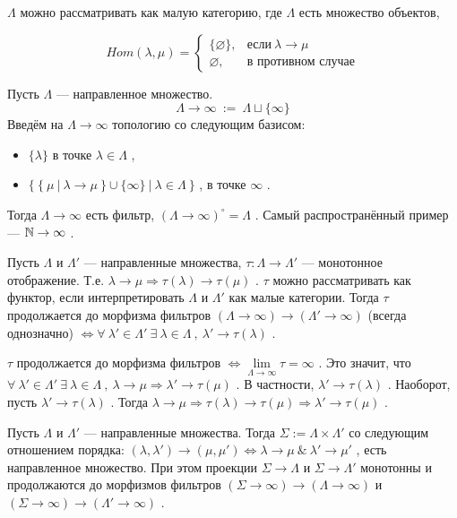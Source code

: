 \( \Lambda \) можно рассматривать как малую категорию, где \( \Lambda \) есть множество объектов,

\[ Hom(\lambda,\mu)=
   \begin{cases}
   \{\varnothing\}, & \text{если} ~\lambda \rightarrow \mu \\
   \varnothing    , & \text{в противном случае}
   \end{cases}
\]

\SSsect[def] Пусть \( \Lambda \) --- направленное множество.
\[ \Lambda \rightarrow \infty ~:=~ \Lambda \sqcup \{\infty\} \]
Введём на \( \Lambda \rightarrow \infty \) топологию со следующим базисом:
\begin{itemize}[label=]
\item \( \{\lambda\} \) в точке \( \lambda \in \Lambda \) ,
\item \( \{~\{~\mu~|~\lambda\rightarrow\mu~\} \cup \{\infty\} ~|~ \lambda \in \Lambda ~\} \) , в точке \( \infty \) .
\end{itemize}
Тогда \( \Lambda \rightarrow \infty \) есть фильтр, \( (\Lambda \rightarrow \infty)^\circ=\Lambda \) . Самый распространённый пример --- \( \mathbb{N} \rightarrow \infty \) .

\SSsect Пусть \( \Lambda \) и \( \Lambda' \) --- направленные множества, \( \tau: \Lambda \rightarrow \Lambda' \) --- монотонное отображение. Т.е. \( \lambda \rightarrow \mu \Rightarrow \tau(\lambda) \rightarrow \tau(\mu) \) . \( \tau \) можно рассматривать как функтор, если интерпретировать \( \Lambda \) и \( \Lambda' \) как малые категории.
Тогда \( \tau \) продолжается до морфизма фильтров \( (\Lambda \rightarrow \infty) \rightarrow (\Lambda' \rightarrow \infty) \) (всегда однозначно) \( \Leftrightarrow  \forall~\lambda' \in \Lambda' ~\exists~\lambda \in \Lambda ~,~ \lambda' \rightarrow \tau(\lambda) \) .

\SSproof

\( \tau \) продолжается до морфизма фильтров \( \Leftrightarrow \lim\limits_{\Lambda \rightarrow \infty} \tau = \infty \) . Это значит, что \( \forall~\lambda' \in \Lambda' ~\exists~\lambda \in \Lambda ~,~ \lambda \rightarrow \mu \Rightarrow \lambda' \rightarrow \tau(\mu) \) . В частности, \( \lambda' \rightarrow \tau(\lambda) \) . Наоборот, пусть \( \lambda' \rightarrow \tau(\lambda) \) . Тогда \( \lambda \rightarrow \mu \Rightarrow \tau(\lambda) \rightarrow \tau(\mu) \Rightarrow \lambda' \rightarrow \tau(\mu) \) .

\SSendp

\SSsect Пусть \( \Lambda \) и \( \Lambda' \) --- направленные множества. Тогда \( \Sigma := \Lambda \times \Lambda' \) со следующим отношением порядка: \( (\lambda,\lambda') \rightarrow (\mu,\mu') \Leftrightarrow \lambda \rightarrow \mu ~\&~  \lambda' \rightarrow \mu' \) , есть направленное множество. При этом проекции \( \Sigma \rightarrow \Lambda \) и \( \Sigma \rightarrow \Lambda' \) монотонны и продолжаются до морфизмов фильтров \( (\Sigma \rightarrow \infty) \rightarrow (\Lambda \rightarrow \infty) \) и \( (\Sigma \rightarrow \infty) \rightarrow (\Lambda' \rightarrow \infty) \) .


